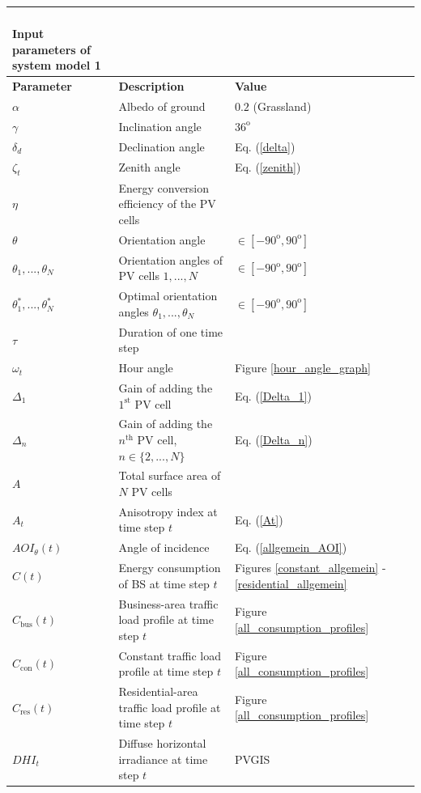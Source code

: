 \begin{longtable}{@{}l*{2}{|l}l@{}}
\caption{\\ Input parameters of system model 1\label{tab:inpu_1}}\\ \toprule
\textbf{Parameter}	&\textbf{Description}				&  \textbf{Value} \\ \midrule
$\alpha$  &Albedo of ground&$0.2$ (Grassland)\\
$\gamma$  &Inclination angle &$36^{\mathrm{o}}$\\
$\delta_d$ &Declination angle & Eq. (\ref{delta})\\
$\zeta_t$  &Zenith angle & Eq. (\ref{zenith})\\
$\eta$  &Energy conversion efficiency of the PV cells & \\
$\theta$  &Orientation angle&$\in [-90^{\mathrm{o}},90^{\mathrm{o}}]$\\
$\theta_1, ..., \theta_N$ &Orientation angles of PV cells $1,..., N$&$\in [-90^{\mathrm{o}},90^{\mathrm{o}}]$\\
$\theta_1^*, ..., \theta_N^*$ &Optimal orientation angles $\theta_1, ..., \theta_N$ &$\in [-90^{\mathrm{o}},90^{\mathrm{o}}]$\\
$\tau$ & Duration of one time step& \\
$\omega_t$ &Hour angle&Figure \ref{hour_angle_graph}\\
$\Delta_1$ &Gain of adding the $1^{\mathrm{st}}$ PV cell&Eq. (\ref{Delta_1})\\
$\Delta_n$ &Gain of adding the $n^{\mathrm{th}}$ PV cell, $n\in\{2, ..., N\}$&Eq. (\ref{Delta_n})\\
$A$ & Total surface area of $N$ PV cells& \\
$A_t$ &Anisotropy index at time step $t$&Eq. (\ref{At}) \\
$AOI_{\theta}(t)$ &Angle of incidence &Eq.  (\ref{allgemein_AOI})\\
$C(t)$ &Energy consumption of BS at time step $t$ &Figures \ref{constant_allgemein} - \ref{residential_allgemein}\\
$C_{\mathrm{bus}}(t)$ & Business-area traffic load profile at time step $t$& Figure \ref{all_consumption_profiles}\\
$C_{\mathrm{con}}(t)$ & Constant traffic load profile at time step $t$&Figure \ref{all_consumption_profiles}\\
$C_{\mathrm{res}}(t)$ &  Residential-area traffic load profile at time step $t$&Figure \ref{all_consumption_profiles}\\
$DHI_t$ &Diffuse horizontal irradiance at time step $t$&PVGIS \cite{PVGIS} \\

\end{longtable}
